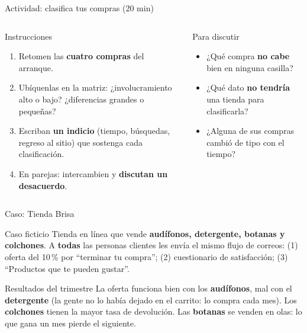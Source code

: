 \documentclass[aspectratio=169,xcolor=dvipsnames]{beamer}
\begin{document}
\begin{frame}{Actividad: clasifica tus compras (20 min)}
\begin{columns}[T]
  \begin{block}{Instrucciones}
    \small
    \begin{enumerate}
      \item Retomen las \textbf{cuatro compras} del arranque.
      \item Ubíquenlas en la matriz: ¿involucramiento alto o bajo? ¿diferencias grandes o pequeñas?
      \item Escriban \textbf{un indicio} (tiempo, búsquedas, regreso al sitio) que sostenga cada clasificación.
      \item En parejas: intercambien y \textbf{discutan un desacuerdo}.
    \end{enumerate}
  \end{block}
  \begin{exampleblock}{Para discutir}
    \small
    \begin{itemize}
      \item ¿Qué compra \textbf{no cabe} bien en ninguna casilla?
      \item ¿Qué dato \textbf{no tendría} una tienda para clasificarla?
      \item ¿Alguna de sus compras cambió de tipo con el tiempo?
    \end{itemize}
  \end{exampleblock}
\end{columns}
\end{frame}

\begin{frame}{Caso: Tienda Brisa}
\begin{exampleblock}{Caso ficticio}
  \small Tienda en línea que vende \textbf{audífonos, detergente, botanas y colchones}. A \textbf{todas} las personas clientes les envía el mismo flujo de correos: (1) oferta del 10\,\% por \enquote{terminar tu compra}; (2) cuestionario de satisfacción; (3) \enquote{Productos que te pueden gustar}.
\end{exampleblock}
\begin{alertblock}{Resultados del trimestre}
  \footnotesize La oferta funciona bien con los \textbf{audífonos}, mal con el \textbf{detergente} (la gente no lo había dejado en el carrito: lo compra cada mes). Los \textbf{colchones} tienen la mayor tasa de devolución. Las \textbf{botanas} se venden en olas: lo que gana un mes pierde el siguiente.
\end{alertblock}
\end{frame}
\end{document}
